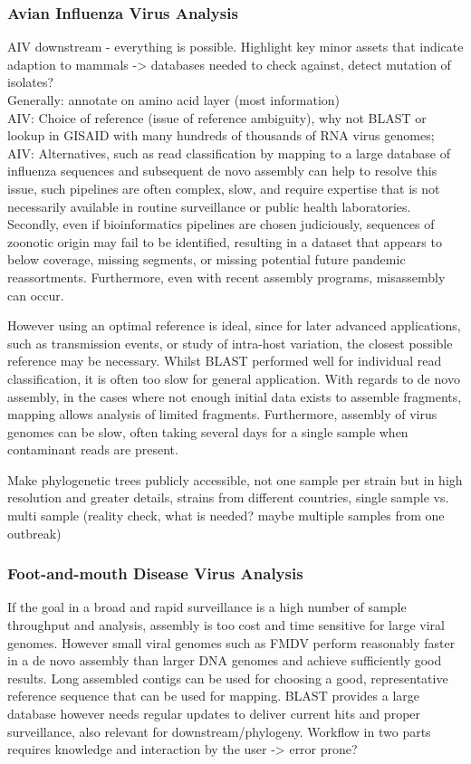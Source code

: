 \subsubsection*{Avian Influenza Virus Analysis}
\ac{AIV} downstream - everything is possible. Highlight key minor assets that indicate adaption to mammals -> databases needed to check against, detect mutation of isolates? \\
Generally: annotate on amino acid layer (most information) \\

AIV: Choice of reference (issue of reference ambiguity), why not BLAST or lookup in GISAID with many hundreds of thousands of RNA virus genomes; \\
AIV: Alternatives, such as read classification by mapping to a large database of influenza sequences and subsequent de novo assembly can help to resolve this issue, such pipelines are often complex, slow, and require expertise that is not necessarily available in routine
surveillance or public health laboratories. Secondly, even if bioinformatics pipelines are chosen judiciously, sequences of zoonotic origin may fail to be identified, resulting in a dataset that appears to below coverage, missing segments, or missing potential future pandemic reassortments. Furthermore, even with recent assembly programs, misassembly can occur.

However using an optimal reference is ideal, since for later advanced applications, such as transmission events, or study of intra-host variation, the closest possible reference may be necessary. Whilst BLAST performed well for individual read classification, it is often too slow for general application. With regards to de novo assembly, in the cases where not enough initial data exists to assemble fragments, mapping allows analysis of limited fragments. Furthermore, assembly of virus genomes can be slow, often taking several days for a single sample when contaminant reads are present.

Make phylogenetic trees publicly accessible, not one sample per strain but in high resolution and greater details, strains from different countries,
single sample vs. multi sample (reality check, what is needed? maybe multiple samples from one outbreak) 


\subsubsection*{Foot-and-mouth Disease Virus Analysis}
If the goal in a broad and rapid surveillance is a high number of sample throughput and analysis, assembly is too cost and time sensitive for large viral genomes. However small viral genomes such as FMDV perform reasonably faster in a de novo assembly than larger DNA genomes and achieve sufficiently good results. Long assembled contigs can be used for choosing a good, representative reference sequence that can be used for mapping. BLAST provides a large database however needs regular updates to deliver current hits and proper surveillance, also relevant for downstream/phylogeny.
Workflow in two parts requires knowledge and interaction by the user -> error prone?

